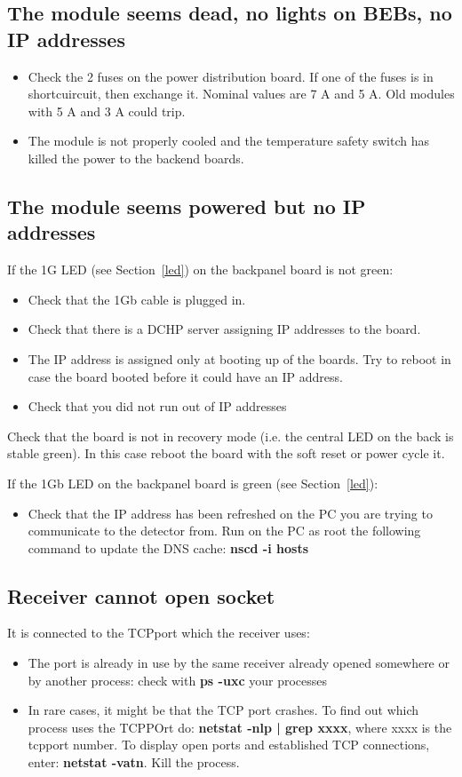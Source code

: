\documentclass{article}
\begin{document}
\subsection{The module seems dead, no lights on BEBs, no IP addresses}
\begin{itemize}
\item Check the 2 fuses on the power distribution board. If one of the fuses is in shortcuircuit, then exchange it. Nominal values are 7 A and 5 A. Old modules with 5 A and 3 A could trip.
\item The module is not properly cooled and the temperature safety switch has killed the power to the backend boards. 
\end{itemize}

\subsection{The module seems powered but no IP addresses}
If the 1G LED (see Section~\ref{led}) on the backpanel board is not green:
\begin{itemize}
\item Check that the 1Gb cable is plugged in.
\item Check that there is a DCHP server assigning IP addresses to the board.
\item The IP address is assigned only at booting up of the boards. Try to reboot in case the board booted before it could have an IP address. 
\item Check that you did not run out of IP addresses 
\end{itemize}
 Check that the board is not in recovery mode (i.e. the central LED on the back is stable green). In this case reboot the board with the soft reset or power cycle it.

If the 1Gb LED on the backpanel board is green (see Section~\ref{led}):
\begin{itemize}
\item Check that the IP address has been refreshed on the PC you are trying to communicate to the detector from. Run on the PC as root the following command to update the DNS cache: \textbf{nscd -i hosts} 
\end{itemize}

\subsection{Receiver cannot open socket}
It is connected to the TCPport which the receiver uses:
\begin{itemize}
\item The port is already in use by the same receiver already opened somewhere or by another process: check with \textbf{ps -uxc} your processes
\item In rare cases, it might be that the TCP port crashes. To find out which process uses the TCPPOrt do: \textbf{netstat -nlp | grep xxxx}, where xxxx is the tcpport number. To display open ports and established TCP connections, enter: \textbf{netstat -vatn}. Kill the process.
 \end{itemize}
\end{document}
